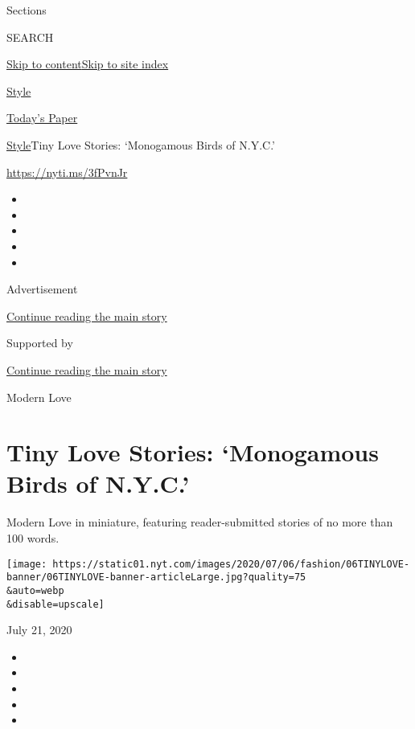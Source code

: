 Sections

SEARCH

\protect\hyperlink{site-content}{Skip to
content}\protect\hyperlink{site-index}{Skip to site index}

\href{https://www.nytimes.com/section/style}{Style}

\href{https://myaccount.nytimes.com/auth/login?response_type=cookie\&client_id=vi}{}

\href{https://www.nytimes.com/section/todayspaper}{Today's Paper}

\href{/section/style}{Style}\textbar{}Tiny Love Stories: `Monogamous
Birds of N.Y.C.'

\url{https://nyti.ms/3fPvnJr}

\begin{itemize}
\item
\item
\item
\item
\item
\end{itemize}

Advertisement

\protect\hyperlink{after-top}{Continue reading the main story}

Supported by

\protect\hyperlink{after-sponsor}{Continue reading the main story}

Modern Love

\hypertarget{tiny-love-stories-monogamous-birds-of-nyc}{%
\section{Tiny Love Stories: `Monogamous Birds of
N.Y.C.'}\label{tiny-love-stories-monogamous-birds-of-nyc}}

Modern Love in miniature, featuring reader-submitted stories of no more
than 100 words.

\texttt{[image: https://static01.nyt.com/images/2020/07/06/fashion/06TINYLOVE-banner/06TINYLOVE-banner-articleLarge.jpg?quality=75\\\&auto=webp\\\&disable=upscale]}

July 21, 2020

\begin{itemize}
\item
\item
\item
\item
\item
\end{itemize}

